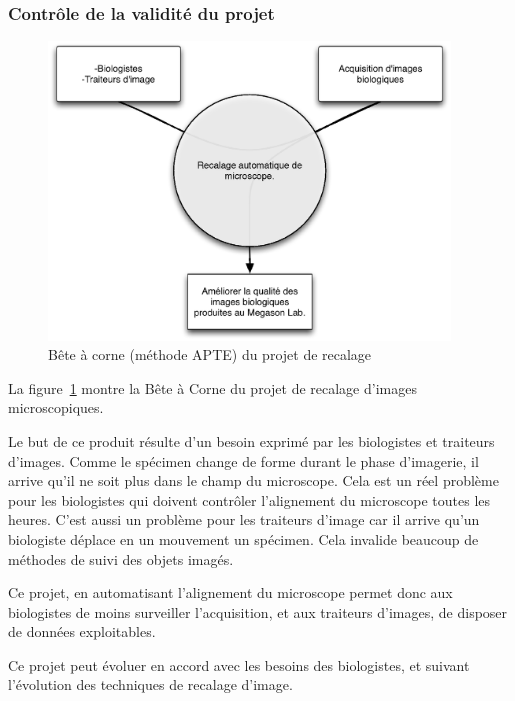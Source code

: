\subsubsection{Contrôle de la validité du projet}
\begin{figure}[h]
\begin{center}
\leavevmode
\includegraphics[width=0.95\textwidth]{pictures/RecalBAC}
\end{center}
\caption{Bête à corne (méthode {APTE\textregistered}) du projet de recalage}
\label{fig:BACRecal}
\end{figure}

La figure~\ref{fig:BACRecal} montre la Bête à Corne du projet de recalage d'images microscopiques.

Le but de ce produit résulte d'un besoin exprimé par les biologistes et traiteurs d'images.
Comme le spécimen change de forme durant le phase d'imagerie, il arrive qu'il ne soit plus dans le champ du microscope.
Cela est un réel problème pour les biologistes qui doivent contrôler l'alignement du microscope toutes les heures.
C'est aussi un problème pour les traiteurs d'image
car il arrive qu'un biologiste déplace en un mouvement un spécimen.
Cela invalide beaucoup de méthodes de suivi des objets imagés.

Ce projet, en automatisant l'alignement du microscope permet donc aux biologistes de moins surveiller l'acquisition,
et aux traiteurs d'images, de disposer de données exploitables.

Ce projet peut évoluer en accord avec les besoins des biologistes, et suivant l'évolution des techniques de recalage d'image.


\newpage

